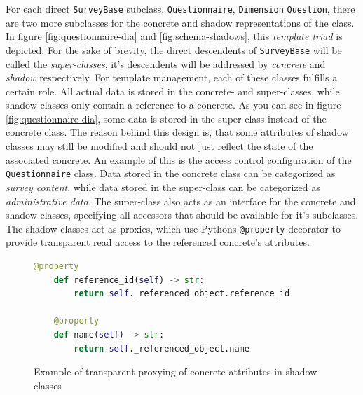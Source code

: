\documentclass[a4paper,11pt]{article}
\def\inline{\lstinline[basicstyle=\ttfamily,keywordstyle={}]}
\begin{document}
                For each direct \inline{SurveyBase} subclass, \inline{Questionnaire}, \inline{Dimension}
                \inline{Question}, there are two more subclasses for the concrete and shadow
                representations of the class. In figure \ref{fig:questionnaire-dia} and \ref{fig:schema-shadows},
                this \textit{template triad} is depicted. For the sake of brevity,
                the direct descendents of \inline{SurveyBase} will be called the \textit{super-classes},
                it's descendents will be addressed by \textit{concrete} and \textit{shadow}
                respectively. For template management,
                each of these classes fulfills a certain role. All actual data is stored
                in the concrete- and super-classes, while shadow-classes only
                contain a reference to a concrete. As you can see in figure \ref{fig:questionnaire-dia},
                some data is stored in the super-class instead of the concrete class.
                The reason behind this design is, that some attributes of shadow classes
                may still be modified and should not just reflect the state of the associated
                concrete. An example of this is the access control configuration
                of the \inline{Questionnaire} class. Data stored in the concrete
                class can be categorized as \textit{survey content}, while data
                stored in the super-class can be categorized as \textit{administrative data}.
                The super-class also acts as an interface for the concrete and shadow classes,
                specifying all accessors that should be available for it's subclasses.
                The shadow classes act as proxies, which use Pythons \inline{@property}
                decorator to provide transparent read access to the referenced concrete's
                attributes.

                \begin{figure}[H]
                    \begin{lstlisting}[language=Python,frame=lines,backgroundcolor=\color{background},firstnumber=285]
    @property
    def reference_id(self) -> str:
        return self._referenced_object.reference_id

    @property
    def name(self) -> str:
        return self._referenced_object.name
                    \end{lstlisting}
                    \caption{Example of transparent proxying of concrete attributes in shadow classes}
                \end{figure}
\end{document}
